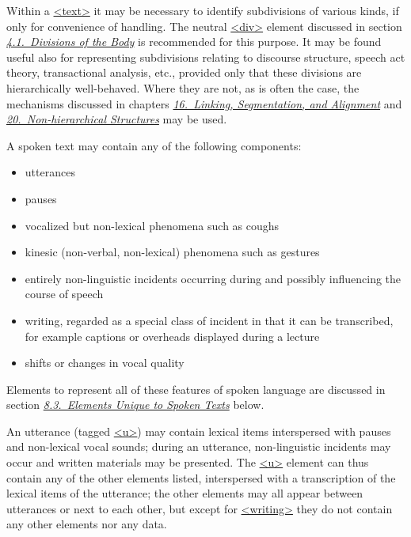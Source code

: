 Within a \hyperref[TEI.text]{<text>} it may be necessary to identify subdivisions of various kinds, if only for convenience of handling. The neutral \hyperref[TEI.div]{<div>} element discussed in section \textit{\hyperref[DSDIV]{4.1.\ Divisions of the Body}} is recommended for this purpose. It may be found useful also for representing subdivisions relating to discourse structure, speech act theory, transactional analysis, etc., provided only that these divisions are hierarchically well-behaved. Where they are not, as is often the case, the mechanisms discussed in chapters \textit{\hyperref[SA]{16.\ Linking, Segmentation, and Alignment}} and \textit{\hyperref[NH]{20.\ Non-hierarchical Structures}} may be used.\par
A spoken text may contain any of the following components: \begin{itemize}
\item utterances
\item pauses
\item vocalized but non-lexical phenomena such as coughs
\item kinesic (non-verbal, non-lexical) phenomena such as gestures
\item entirely non-linguistic incidents occurring during and possibly influencing the course of speech
\item writing, regarded as a special class of incident in that it can be transcribed, for example captions or overheads displayed during a lecture
\item shifts or changes in vocal quality
\end{itemize} \par
Elements to represent all of these features of spoken language are discussed in section \textit{\hyperref[TSBA]{8.3.\ Elements Unique to Spoken Texts}} below.\par
An utterance (tagged \hyperref[TEI.u]{<u>}) may contain lexical items interspersed with pauses and non-lexical vocal sounds; during an utterance, non-linguistic incidents may occur and written materials may be presented. The \hyperref[TEI.u]{<u>} element can thus contain any of the other elements listed, interspersed with a transcription of the lexical items of the utterance; the other elements may all appear between utterances or next to each other, but except for \hyperref[TEI.writing]{<writing>} they do not contain any other elements nor any data.\par
